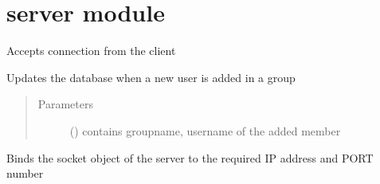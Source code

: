 \documentclass[letterpaper,10pt,english]{sphinxmanual}
\begin{document}
\section{server module}
\label{\detokenize{server:module-server}}\label{\detokenize{server:server-module}}\label{\detokenize{server::doc}}

\begin{fulllineitems}
\label{\detokenize{server:server.acceptClient}}
Accepts connection from the client

\end{fulllineitems}


\begin{fulllineitems}
\label{\detokenize{server:server.add_member}}
Updates the database when a new user is added in a group
\begin{quote}\begin{description}
\item[{Parameters}] \leavevmode
{} () \textendash{} contains groupname, username of the added member

\end{description}\end{quote}

\end{fulllineitems}


\begin{fulllineitems}
\label{\detokenize{server:server.bindSocket}}
Binds the socket object of the server to the required IP address and PORT number

\end{fulllineitems}

\end{document}
